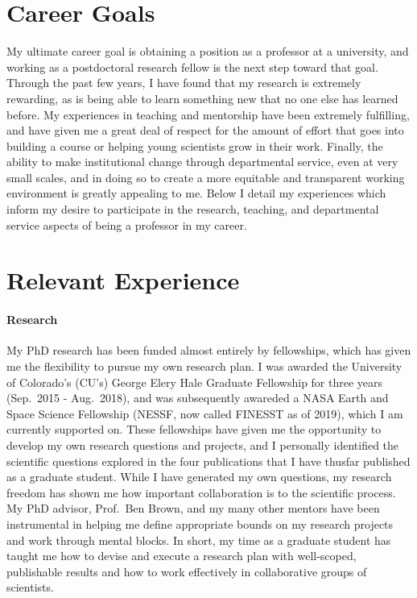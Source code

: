 \documentclass[aps, pre, onecolumn, nofootinbib, notitlepage, groupedaddress, amsfonts, amssymb, amsmath]{revtex4-1}
\begin{document}
\section*{Career Goals}
\vspace{-12pt}
My ultimate career goal is obtaining a position as a professor at a university, and working as a postdoctoral research fellow is the next step toward that goal.
Through the past few years, I have found that my research is extremely rewarding, as is being able to learn something new that no one else has learned before.
My experiences in teaching and mentorship have been extremely fulfilling, and have given me a great deal of respect for the amount of effort that goes into building a course or helping young scientists grow in their work.
Finally, the ability to make institutional change through departmental service, even at very small scales, and in doing so to create a more equitable and transparent working environment is greatly appealing to me.
Below I detail my experiences which inform my desire to participate in the research, teaching, and departmental service aspects of being a professor in my career.

\section*{Relevant Experience}
\vspace{-12pt}
\paragraph*{Research}
My PhD research has been funded almost entirely by fellowships, which has given me the flexibility to pursue my own research plan.
I was awarded the University of Colorado's (CU's) George Elery Hale Graduate Fellowship for three years (Sep.~2015 - Aug.~2018), and was subsequently awareded a NASA Earth and Space Science Fellowship (NESSF, now called FINESST as of 2019), which I am currently supported on.
These fellowships have given me the opportunity to develop my own research questions and projects, and I personally identified the scientific questions explored in the four publications that I have thusfar published as a graduate student.
While I have generated my own questions, my research freedom has shown me how important collaboration is to the scientific process.
My PhD advisor, Prof.~Ben Brown, and my many other mentors have been instrumental in helping me define appropriate bounds on my research projects and work through mental blocks.
In short, my time as a graduate student has taught me how to devise and execute a research plan with well-scoped, publishable results and how to work effectively in collaborative groups of scientists.
\end{document}
